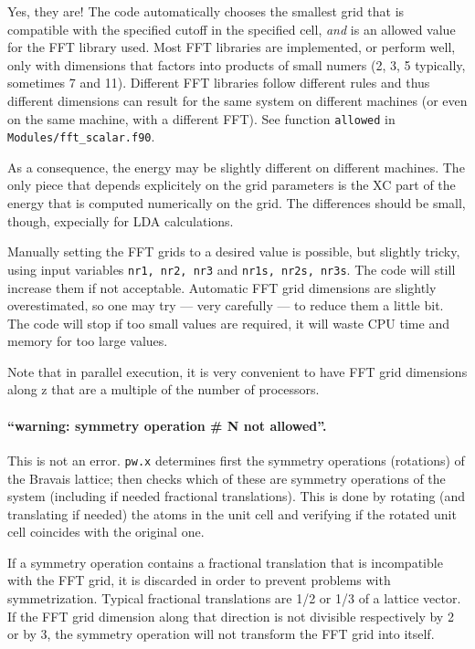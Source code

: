 \documentclass[12pt,a4paper]{article}
\begin{document}
Yes, they are!
The code automatically chooses the smallest grid that is compatible
with the specified cutoff in the specified cell, \emph{and} is an
allowed value for the FFT library used.
Most FFT libraries are implemented, or perform well, only with
dimensions that factors into products of small numers (2, 3, 5
typically, sometimes 7 and 11).
Different FFT libraries follow different rules and thus different
dimensions can result for the same system on different machines (or
even on the same machine, with a different FFT).
See function \texttt{allowed} in \texttt{Modules/fft\_scalar.f90}.

As a consequence, the energy may be slightly different on different
machines.
The only piece that depends explicitely on the grid parameters is the
XC part of the energy that is computed numerically on the grid.
The differences should be small, though, expecially for LDA
calculations.

Manually setting the FFT grids to a desired value is possible, but
slightly tricky, using input variables \texttt{nr1, nr2, nr3} and
\texttt{nr1s, nr2s, nr3s}.
The code will still increase them if not acceptable.
Automatic FFT grid dimensions are slightly overestimated, so one may
try --- very carefully --- to reduce them a little bit.
The code will stop if too small values are required, it will waste CPU
time and memory for too large values.

Note that in parallel execution, it is very convenient to have FFT
grid dimensions along z that are a multiple of the number of
processors.

\paragraph{``warning: symmetry operation \# N not allowed''.}

This is not an error.
\texttt{pw.x} determines first the symmetry operations (rotations)
of the Bravais lattice; then checks which of these are symmetry
operations of the system (including if needed fractional
translations).
This is done by rotating (and translating if needed) the atoms in
the unit cell and verifying if the rotated unit cell coincides
with the original one. 

If a symmetry operation contains a
fractional translation that is incompatible with the FFT grid,
it is discarded in order to prevent problems with symmetrization.
Typical fractional translations are 1/2 or 1/3 of a lattice
vector. If the FFT grid dimension along that direction is not 
divisible respectively by 2 or by 3, the symmetry operation will 
not transform the FFT grid into itself.
\end{document}
